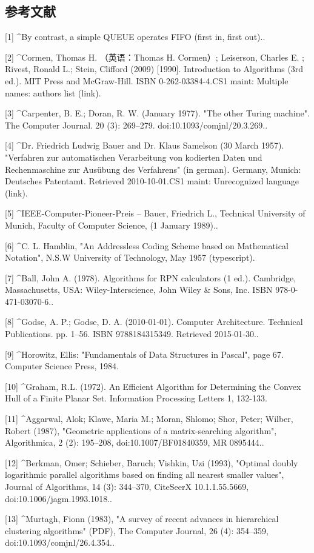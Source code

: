 \subsection{参考文献}
[1]
^By contrast, a simple QUEUE operates FIFO (first in, first out)..

[2]
^Cormen, Thomas H. （英语：Thomas H. Cormen）; Leiserson, Charles E. ; Rivest, Ronald L.; Stein, Clifford (2009) [1990]. Introduction to Algorithms (3rd ed.). MIT Press and McGraw-Hill. ISBN 0-262-03384-4.CS1 maint: Multiple names: authors list (link).

[3]
^Carpenter, B. E.; Doran, R. W. (January 1977). "The other Turing machine". The Computer Journal. 20 (3): 269–279. doi:10.1093/comjnl/20.3.269..

[4]
^Dr. Friedrich Ludwig Bauer and Dr. Klaus Samelson (30 March 1957). "Verfahren zur automatischen Verarbeitung von kodierten Daten und Rechenmaschine zur Ausübung des Verfahrens" (in german). Germany, Munich: Deutsches Patentamt. Retrieved 2010-10-01.CS1 maint: Unrecognized language (link).

[5]
^IEEE-Computer-Pioneer-Preis -- Bauer, Friedrich L., Technical University of Munich, Faculty of Computer Science, (1 January 1989)..

[6]
^C. L. Hamblin, "An Addressless Coding Scheme based on Mathematical Notation", N.S.W University of Technology, May 1957 (typescript).

[7]
^Ball, John A. (1978). Algorithms for RPN calculators (1 ed.). Cambridge, Massachusetts, USA: Wiley-Interscience, John Wiley & Sons, Inc. ISBN 978-0-471-03070-6..

[8]
^Godse, A. P.; Godse, D. A. (2010-01-01). Computer Architecture. Technical Publications. pp. 1–56. ISBN 9788184315349. Retrieved 2015-01-30..

[9]
^Horowitz, Ellis: "Fundamentals of Data Structures in Pascal", page 67. Computer Science Press, 1984.

[10]
^Graham, R.L. (1972). An Efficient Algorithm for Determining the Convex Hull of a Finite Planar Set. Information Processing Letters 1, 132-133.

[11]
^Aggarwal, Alok; Klawe, Maria M.; Moran, Shlomo; Shor, Peter; Wilber, Robert (1987), "Geometric applications of a matrix-searching algorithm", Algorithmica, 2 (2): 195–208, doi:10.1007/BF01840359, MR 0895444..

[12]
^Berkman, Omer; Schieber, Baruch; Vishkin, Uzi (1993), "Optimal doubly logarithmic parallel algorithms based on finding all nearest smaller values", Journal of Algorithms, 14 (3): 344–370, CiteSeerX 10.1.1.55.5669, doi:10.1006/jagm.1993.1018..

[13]
^Murtagh, Fionn (1983), "A survey of recent advances in hierarchical clustering algorithms" (PDF), The Computer Journal, 26 (4): 354–359, doi:10.1093/comjnl/26.4.354..
